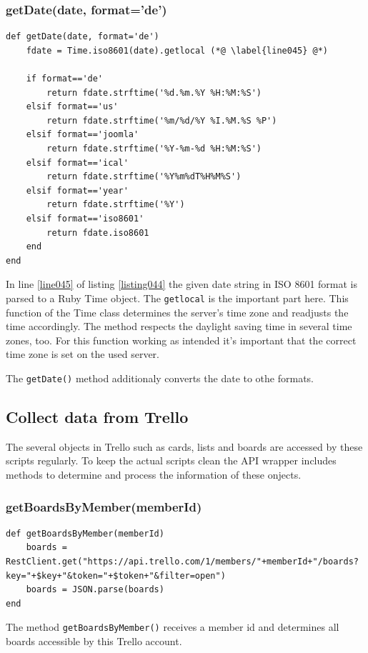 \subsubsection{getDate(date, format='de')}
\begin{lstlisting}[aboveskip=1\baselineskip, caption=\lstinline{getDate()}, label=listing044]
def getDate(date, format='de')
	fdate = Time.iso8601(date).getlocal (*@ \label{line045} @*)
	
	if format=='de'
		return fdate.strftime('%d.%m.%Y %H:%M:%S')
	elsif format=='us'
		return fdate.strftime('%m/%d/%Y %I.%M.%S %P')
	elsif format=='joomla'
		return fdate.strftime('%Y-%m-%d %H:%M:%S')
	elsif format=='ical'
		return fdate.strftime('%Y%m%dT%H%M%S')
	elsif format=='year'
		return fdate.strftime('%Y')
	elsif format=='iso8601'
		return fdate.iso8601
	end
end
\end{lstlisting}

In line \ref{line045} of listing \ref{listing044} the given date string in ISO 8601 format is parsed to a Ruby Time object. The \lstinline{getlocal} is the important part here. This function of the Time class determines the server's time zone and readjusts the time accordingly. The method respects the daylight saving time in several time zones, too. For this function working as intended it's important that the correct time zone is set on the used server. 

The \lstinline{getDate()} method additionaly converts the date to othe formats. 

\subsection{Collect data from Trello}
The several objects in Trello such as cards, lists and boards are accessed by these scripts regularly. To keep the actual scripts clean the API wrapper includes methods to determine and process the information of these onjects.

\subsubsection{getBoardsByMember(memberId)}
\begin{lstlisting}[aboveskip=1\baselineskip, caption=\lstinline{getBoardsByMember()}, label=listing045]
def getBoardsByMember(memberId)
	boards = RestClient.get("https://api.trello.com/1/members/"+memberId+"/boards?key="+$key+"&token="+$token+"&filter=open")
	boards = JSON.parse(boards)
end
\end{lstlisting}
The method \lstinline{getBoardsByMember()} receives a member id and determines all boards accessible by this Trello account.

